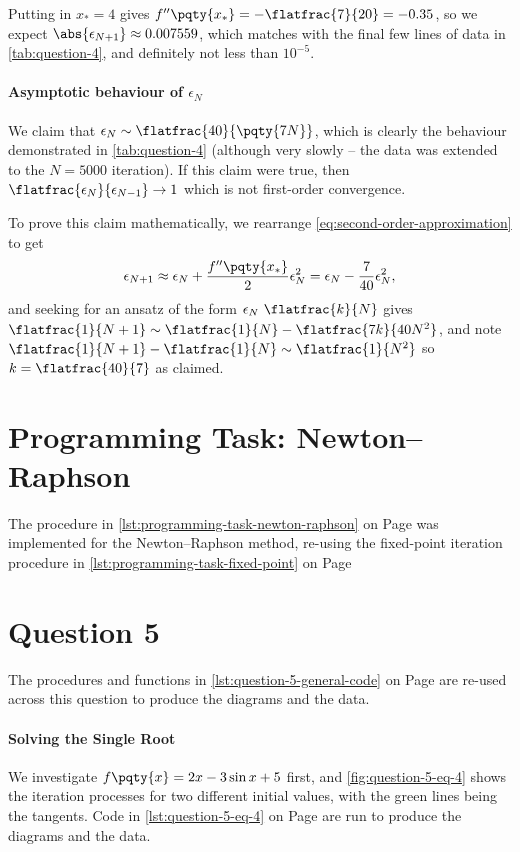\documentclass{article}
\begin{document}
Putting in \(x_{\ast} = 4\) gives \(f''\pqty{x_\ast} = - \flatfrac{7}{20} = -0.35\), so we expect \(\abs{\epsilon_{N + 1}} \approx 0.007559\), which matches with the final few lines of data in \autoref{tab:question-4}, and definitely not less than \(10^{-5}\).

\paragraph{Asymptotic behaviour of \(\epsilon_N\)} We claim that \(\epsilon_N \sim \flatfrac{40}{\pqty{7N}}\), which is clearly the behaviour demonstrated in \autoref{tab:question-4} (although very slowly -- the data was extended to the \(N = 5000\) iteration). If this claim were true, then \(\flatfrac{\epsilon_N}{\epsilon_{N - 1}} \to 1\) which is not first-order convergence.

To prove this claim mathematically, we rearrange \autoref{eq:second-order-approximation} to get 
\begin{equation}
    \epsilon_{N + 1} \approx \epsilon_N + \frac{f''\pqty{x_{\ast}}}{2} \epsilon_N^2 = \epsilon_N - \frac{7}{40} \epsilon_N^2,
\end{equation}
and seeking for an ansatz of the form \(\epsilon_N ~ \flatfrac{k}{N}\) gives \(\flatfrac{1}{N + 1} \sim \flatfrac{1}{N} - \flatfrac{7 k}{40 N^2}\), and note \(\flatfrac{1}{N + 1} - \flatfrac{1}{N} \sim \flatfrac{1}{N^2}\) so \(k = \flatfrac{40}{7}\) as claimed.

\section{Programming Task: Newton--Raphson}

The procedure in \autoref{lst:programming-task-newton-raphson} on Page \pageref{lst:programming-task-newton-raphson} was implemented for the Newton--Raphson method, re-using the fixed-point iteration procedure in \autoref{lst:programming-task-fixed-point} on Page \pageref{lst:programming-task-fixed-point}

\section{Question 5}

The procedures and functions in \autoref{lst:question-5-general-code} on Page \pageref{lst:question-5-general-code} are re-used across this question to produce the diagrams and the data.

\paragraph{Solving the Single Root} We investigate \(f\pqty{x} = 2 x - 3 \sin x + 5\) first, and \autoref{fig:question-5-eq-4} shows the iteration processes for two different initial values, with the green lines being the tangents. Code in \autoref{lst:question-5-eq-4} on Page \pageref{lst:question-5-eq-4} are run to produce the diagrams and the data.
\end{document}
